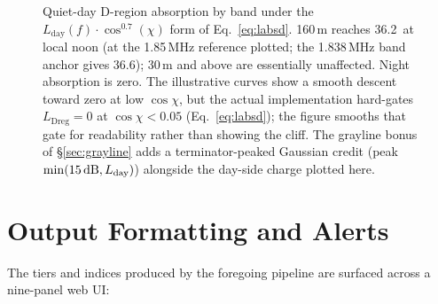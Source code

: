 \documentclass[11pt,a4paper]{article}
\newcommand{\SI}[2]{#1\,\text{#2}}
\newcommand{\dB}{\text{dB}}
\begin{document}
\begin{figure}[H]
\caption{Quiet-day D-region absorption by band under the
         $L_{\text{day}}(f) \cdot \cos^{0.7}(\chi)$ form of
         Eq.~\ref{eq:labsd}.  160\,m reaches
         \SI{36.2}{\dB} at local noon (at the 1.85\,MHz reference
         plotted; the 1.838\,MHz band anchor gives 36.6);
         30\,m and above are
         essentially unaffected.  Night absorption is zero.  The
         illustrative curves show a smooth descent toward zero at
         low $\cos\chi$, but the actual implementation hard-gates
         $L_{\text{Dreg}} = 0$ at $\cos\chi < 0.05$
         (Eq.~\ref{eq:labsd}); the figure smooths that gate for
         readability rather than showing the cliff.  The grayline
         bonus of \S\ref{sec:grayline} adds a terminator-peaked
         Gaussian credit (peak $\min(\SI{15}{\dB},
         L_{\text{day}})$) alongside the day-side charge plotted
         here.}
\label{fig:dabs}
\end{figure}

\section{Output Formatting and Alerts}\label{sec:output}

The tiers and indices produced by the foregoing pipeline are
surfaced across a nine-panel web UI:
\end{document}
